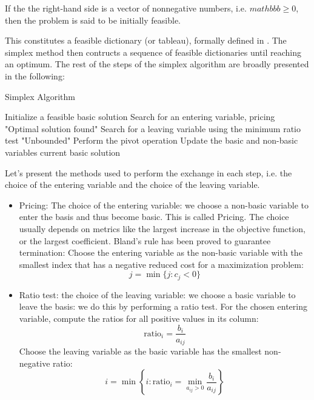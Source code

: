  If the the right-hand side is a vector of nonnegative numbers, i.e. $mathbb{b} \geq 0 $, then
 the problem is said to be initially feasible.

This constitutes a feasible dictionary (or tableau), formally defined in \parencite{chvatal1983linear}.
The simplex method then contructs a sequence of feasible dictionaries until reaching an optimum.
The rest of the steps of the simplex algorithm are broadly presented in the following:

\begin{algorithm}
    \caption{Simplex Algorithm}
    \begin{algorithmic}[1]
        \State Initialize a feasible basic solution
        \State Search for an entering variable, pricing
        \State \Return "Optimal solution found"
        \EndIf
        \State Search for a leaving variable using the minimum ratio test
        \State \Return "Unbounded"
        \EndIf
        \State Perform the pivot operation
        \State Update the basic and non-basic variables
        \State \Return current basic solution
        \EndProcedure
    \end{algorithmic}
\end{algorithm}


Let's present the methods used to perform the exchange in each step, i.e. the choice of the entering
variable and the choice of the leaving variable.

\begin{itemize}
    \item Pricing: The choice of the entering variable: we choose a non-basic variable to enter the basis
          and thus become basic. This is called Pricing. The choice usually depends on metrics
          like the largest increase in the objective function, or the largest coefficient. 
          Bland's rule has been proved to guarantee termination:
          Choose the entering variable as the non-basic variable with 
          the smallest index that has a negative reduced cost for a maximization problem:
    \[
    j = \min \{ j : c_j < 0 \}
    \]

    \item Ratio test: the choice of the leaving variable: we choose a basic variable to leave the basis:
          we do this by performing a ratio test.
          For the chosen entering variable, compute the ratios for all positive values in its column:
    \[
    \text{ratio}_i = \frac{b_i}{a_{ij}}
    \]
    Choose the leaving variable as the basic variable  has the smallest non-negative ratio:
    \[
    i = \min \left\{ i : \text{ratio}_i = \min_{a_{ij} > 0} \frac{b_i}{a_{ij}} \right\}
    \]
\end{itemize}

